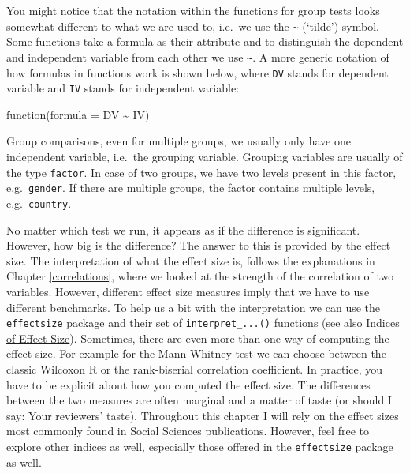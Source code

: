 \documentclass[
]{book}
\begin{document}
You might notice that the notation within the functions for group tests looks somewhat different to what we are used to, i.e.~we use the \texttt{\textasciitilde{}} (`tilde') symbol. Some functions take a formula as their attribute and to distinguish the dependent and independent variable from each other we use \texttt{\textasciitilde{}}. A more generic notation of how formulas in functions work is shown below, where \texttt{DV} stands for dependent variable and \texttt{IV} stands for independent variable:

\leavevmode\hypertarget{formulas-in-functions}{}%
function(formula = DV \textasciitilde{} IV)

Group comparisons, even for multiple groups, we usually only have one independent variable, i.e.~the grouping variable. Grouping variables are usually of the type \texttt{factor}. In case of two groups, we have two levels present in this factor, e.g.~\texttt{gender}. If there are multiple groups, the factor contains multiple levels, e.g.~\texttt{country}.

No matter which test we run, it appears as if the difference is significant. However, how big is the difference? The answer to this is provided by the effect size. The interpretation of what the effect size is, follows the explanations in Chapter \ref{correlations}, where we looked at the strength of the correlation of two variables. However, different effect size measures imply that we have to use different benchmarks. To help us a bit with the interpretation we can use the \texttt{effectsize} package and their set of \texttt{interpret\_...()} functions (see also \href{https://easystats.github.io/effectsize/articles/interpret.html}{Indices of Effect Size}). Sometimes, there are even more than one way of computing the effect size. For example for the Mann-Whitney test we can choose between the classic Wilcoxon R or the rank-biserial correlation coefficient. In practice, you have to be explicit about how you computed the effect size. The differences between the two measures are often marginal and a matter of taste (or should I say: Your reviewers' taste). Throughout this chapter I will rely on the effect sizes most commonly found in Social Sciences publications. However, feel free to explore other indices as well, especially those offered in the \texttt{effectsize} package as well.
\end{document}
